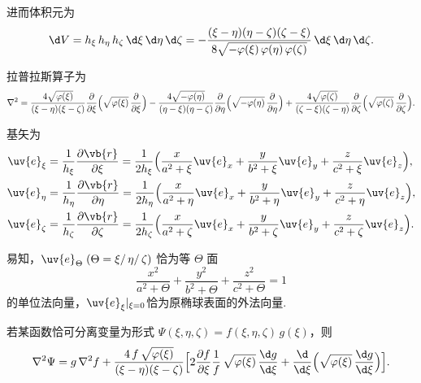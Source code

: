 进而体积元为
\begin{equation*}
	\d V
	=h_{\xi}\,h_{\eta}\,h_{\zeta}\,\d \xi\, \d \eta\, \d \zeta=-\frac{(\xi-\eta)(\eta-\zeta)(\zeta-\xi)}
	{8\sqrt{-\varphi(\xi)\,\varphi(\eta)\,\varphi(\zeta)}}\,
	\d \xi\,\d \eta\,\d \zeta.
\end{equation*}

拉普拉斯算子为
\begin{equation*}
	\nabla^{2}
	=\frac{4\sqrt{\varphi(\xi)}}{(\xi-\eta)(\xi-\zeta)}
	\frac{\partial}{\partial\xi}\Bigl(\sqrt{\varphi(\xi)}\,
	\frac{\partial}{\partial\xi}\Bigr)\nonumber
	-\frac{4\sqrt{-\varphi(\eta)}}{(\eta-\xi)(\eta-\zeta)}
	\frac{\partial}{\partial\eta}\Bigl(\sqrt{-\varphi(\eta)}\,
	\frac{\partial}{\partial\eta}\Bigr)\nonumber
	+\frac{4\sqrt{\varphi(\zeta)}}{(\zeta-\xi)(\zeta-\eta)}
	\frac{\partial}{\partial\zeta}\Bigl(\sqrt{\varphi(\zeta)}\,
	\frac{\partial}{\partial\zeta}\Bigr).
\end{equation*}

基矢为
\begin{align*}
	\uv{e}_{\xi}
	 & =\frac{1}{h_{\xi}}\frac{\partial\vb{r}}{\partial\xi}
	=\frac{1}{2h_{\xi}}\Bigl(\frac{x}{a^{2}+\xi}\uv{e}_{x}
	+\frac{y}{b^{2}+\xi}\uv{e}_{y}
	+\frac{z}{c^{2}+\xi}\uv{e}_{z}\Bigr),\notag                 \\
	\uv{e}_{\eta}
	 & =\frac{1}{h_{\eta}}\frac{\partial\vb{r}}{\partial\eta}
	=\frac{1}{2h_{\eta}}\Bigl(\frac{x}{a^{2}+\eta}\uv{e}_{x}
	+\frac{y}{b^{2}+\eta}\uv{e}_{y}
	+\frac{z}{c^{2}+\eta}\uv{e}_{z}\Bigr),\notag                \\
	\uv{e}_{\zeta}
	 & =\frac{1}{h_{\zeta}}\frac{\partial\vb{r}}{\partial\zeta}
	=\frac{1}{2h_{\zeta}}\Bigl(\frac{x}{a^{2}+\zeta}\uv{e}_{x}
	+\frac{y}{b^{2}+\zeta}\uv{e}_{y}
	+\frac{z}{c^{2}+\zeta}\uv{e}_{z}\Bigr).
\end{align*}

易知，\(\uv{e}_{\Theta}\;(\Theta=\xi/\,\eta/\,\zeta)\) 恰为等 \(\Theta\) 面
\begin{equation*}
	\frac{x^{2}}{a^{2}+\Theta}+\frac{y^{2}}{b^{2}+\Theta}+\frac{z^{2}}{c^{2}+\Theta}=1
\end{equation*}
的单位法向量，\(\uv{e}_{\xi}|_{\xi=0}\)恰为原椭球表面的外法向量.

若某函数恰可分离变量为形式
\(\Psi(\xi,\eta,\zeta)=f(\xi,\eta,\zeta)\,g(\xi)\)，则
\begin{equation*}
	\nabla^{2}\Psi
	=g\,\nabla^{2}f
	+\frac{4\,f\,\sqrt{\varphi(\xi)}}{(\xi-\eta)(\xi-\zeta)}
	\Bigl[
		2\frac{\partial f}{\partial\xi}\frac{1}{f}\,
		\sqrt{\varphi(\xi)}\,\frac{\d g}{\d \xi}
		+\frac{\d}{\d \xi}\Bigl(\sqrt{\varphi(\xi)}\,\frac{\d g}{\d \xi}\Bigr)
		\Bigr].
\end{equation*}